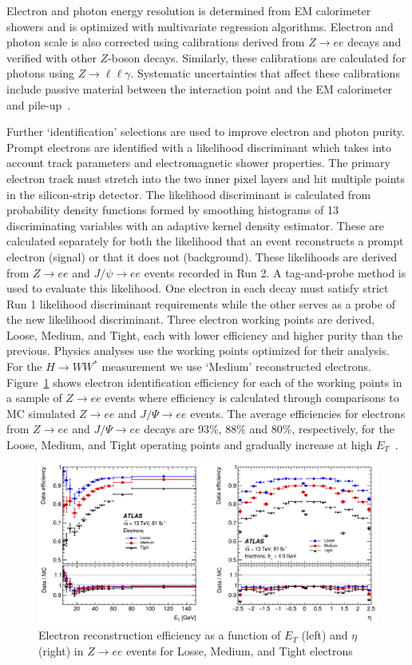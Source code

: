 Electron and photon energy resolution is determined from EM calorimeter showers and is optimized with multivariate regression algorithms. Electron and photon scale is also corrected using calibrations derived from $Z\rightarrow ee$ decays and verified with other $Z$-boson decays. Similarly, these calibrations are calculated for photons using $Z\rightarrow \ell\ell\gamma$. Systematic uncertainties that affect these calibrations include passive material between the interaction point and the EM calorimeter and pile-up~\cite{ElectronPhotonPerformance}. 

Further `identification' selections are used to improve electron and photon purity. Prompt electrons are identified with a likelihood discriminant which takes into account track parameters and electromagnetic shower properties. The primary electron track must stretch into the two inner pixel layers and hit multiple points in the silicon-strip detector. The likelihood discriminant is calculated from probability density functions formed by smoothing histograms of 13 discriminating variables with an adaptive kernel density estimator.  These are calculated separately for both the likelihood that an event reconstructs a prompt electron (signal) or that it does not (background). These likelihoods are derived from $Z\rightarrow ee$ and $J/\psi\rightarrow ee$ events recorded in Run 2. A tag-and-probe method is used to evaluate this likelihood. One electron in each decay must satisfy strict Run 1 likelihood discriminant requirements while the other serves as a probe of the new likelihood discriminant. Three electron working points are derived, Loose, Medium, and Tight, each with lower efficiency and higher purity than the previous. Physics analyses use the working points optimized for their analysis. For the $H\rightarrow WW^*$ measurement we use `Medium' reconstructed electrons. Figure~\ref{fig:ElectronEff} shows electron identification efficiency for each of the working points in a sample of $Z\rightarrow ee$ events where efficiency is calculated through comparisons to MC simulated $Z\rightarrow ee$ and $J/\Psi\rightarrow ee$ events. The average efficiencies for electrons from $Z\rightarrow ee$ and $J/\Psi\rightarrow ee$ decays are 93\%, 88\% and 80\%, respectively, for the Loose, Medium, and Tight operating points and gradually increase at high $E_T$~\cite{ElectronPhotonPerformance}.

\begin{figure}[!h]
        \centering
    \includegraphics[width=.75\textwidth]{Pictures/ElectroEff.png}
    \caption{ Electron reconstruction efficiency as a function of $E_T$ (left) and $\eta$ (right) in $Z\rightarrow ee$ events for Losse, Medium, and Tight electrons~\cite{ElectronPhotonPerformance}}
    \label{fig:ElectronEff}
\end{figure}

